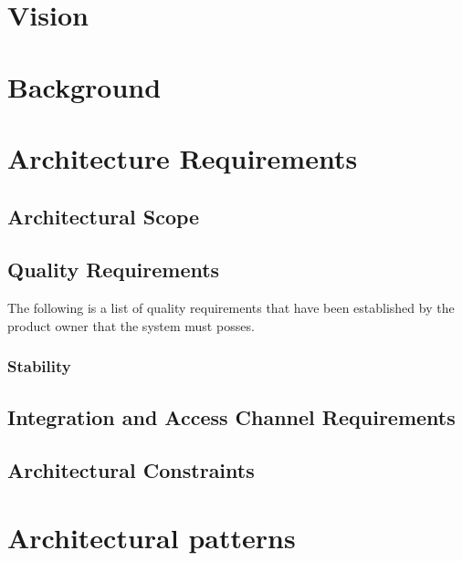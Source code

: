\documentclass{article}
\begin{document}
	\section{Vision}%
	
	
	\section{Background} %

	\newpage
	
	\section{Architecture Requirements}%
		\subsection{Architectural Scope}%
		
			\setlength{\leftskip}{45px}
				\lipsum[2]

		\subsection{Quality Requirements}%
			The following is a list of quality requirements that have been established by the product owner that the system must posses.
			\subsubsection{Stability}
				\setlength{\leftskip}{61px}
			 	
		\subsection{Integration and Access Channel Requirements}%
		\subsection{Architectural Constraints }%
	\section{Architectural patterns}%
\end{document}

